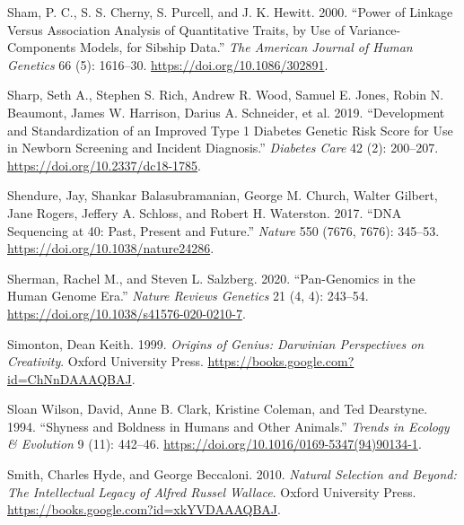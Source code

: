 \documentclass[
]{book}
\newlength{\cslhangindent}
\newlength{\cslentryspacingunit} %
\newenvironment{CSLReferences}[2] %
 {%
  \setlength{\parindent}{0pt}
  \ifodd #1
  \let\oldpar\par
  \def\par{\hangindent=\cslhangindent\oldpar}
  \fi
  \setlength{\parskip}{#2\cslentryspacingunit}
 }%
 {}
\begin{document}
\begin{CSLReferences}{1}{0}
\leavevmode{}%
Sham, P. C., S. S. Cherny, S. Purcell, and J. K. Hewitt. 2000. {``Power of {Linkage} Versus {Association Analysis} of {Quantitative Traits}, by {Use} of {Variance-Components Models}, for {Sibship Data}.''} \emph{The American Journal of Human Genetics} 66 (5): 1616--30. \url{https://doi.org/10.1086/302891}.

\leavevmode{}%
Sharp, Seth A., Stephen S. Rich, Andrew R. Wood, Samuel E. Jones, Robin N. Beaumont, James W. Harrison, Darius A. Schneider, et al. 2019. {``Development and {Standardization} of an {Improved Type} 1 {Diabetes Genetic Risk Score} for {Use} in {Newborn Screening} and {Incident Diagnosis}.''} \emph{Diabetes Care} 42 (2): 200--207. \url{https://doi.org/10.2337/dc18-1785}.

\leavevmode{}%
Shendure, Jay, Shankar Balasubramanian, George M. Church, Walter Gilbert, Jane Rogers, Jeffery A. Schloss, and Robert H. Waterston. 2017. {``{DNA} Sequencing at 40: Past, Present and Future.''} \emph{Nature} 550 (7676, 7676): 345--53. \url{https://doi.org/10.1038/nature24286}.

\leavevmode{}%
Sherman, Rachel M., and Steven L. Salzberg. 2020. {``Pan-Genomics in the Human Genome Era.''} \emph{Nature Reviews Genetics} 21 (4, 4): 243--54. \url{https://doi.org/10.1038/s41576-020-0210-7}.

\leavevmode{}%
Simonton, Dean Keith. 1999. \emph{Origins of {Genius}: {Darwinian Perspectives} on {Creativity}}. {Oxford University Press}. \url{https://books.google.com?id=ChNnDAAAQBAJ}.

\leavevmode{}%
Sloan Wilson, David, Anne B. Clark, Kristine Coleman, and Ted Dearstyne. 1994. {``Shyness and Boldness in Humans and Other Animals.''} \emph{Trends in Ecology \& Evolution} 9 (11): 442--46. \url{https://doi.org/10.1016/0169-5347(94)90134-1}.

\leavevmode{}%
Smith, Charles Hyde, and George Beccaloni. 2010. \emph{Natural {Selection} and {Beyond}: {The Intellectual Legacy} of {Alfred Russel Wallace}}. {Oxford University Press}. \url{https://books.google.com?id=xkYVDAAAQBAJ}.


\end{CSLReferences}
\end{document}
